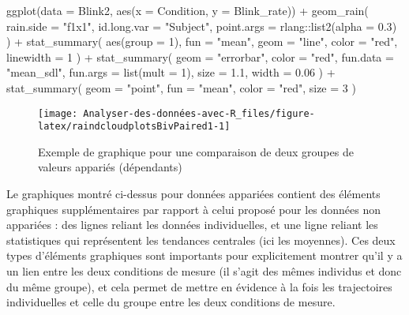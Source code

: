 \documentclass[
]{book}
\newenvironment{Shaded}{\begin{snugshade}}{\end{snugshade}}
\newcommand{\AttributeTok}[1]{\textcolor[rgb]{0.77,0.63,0.00}{#1}}
\newcommand{\DecValTok}[1]{\textcolor[rgb]{0.00,0.00,0.81}{#1}}
\newcommand{\FloatTok}[1]{\textcolor[rgb]{0.00,0.00,0.81}{#1}}
\newcommand{\FunctionTok}[1]{\textcolor[rgb]{0.00,0.00,0.00}{#1}}
\newcommand{\NormalTok}[1]{#1}
\newcommand{\SpecialCharTok}[1]{\textcolor[rgb]{0.00,0.00,0.00}{#1}}
\newcommand{\StringTok}[1]{\textcolor[rgb]{0.31,0.60,0.02}{#1}}
\begin{document}
\begin{Shaded}
\begin{Highlighting}[]
\FunctionTok{ggplot}\NormalTok{(}\AttributeTok{data =}\NormalTok{ Blink2, }\FunctionTok{aes}\NormalTok{(}\AttributeTok{x =}\NormalTok{ Condition, }\AttributeTok{y =}\NormalTok{ Blink\_rate)) }\SpecialCharTok{+}
  \FunctionTok{geom\_rain}\NormalTok{(}
    \AttributeTok{rain.side =} \StringTok{"f1x1"}\NormalTok{,}
    \AttributeTok{id.long.var =} \StringTok{"Subject"}\NormalTok{,}
    \AttributeTok{point.args =}\NormalTok{ rlang}\SpecialCharTok{::}\FunctionTok{list2}\NormalTok{(}\AttributeTok{alpha =} \FloatTok{0.3}\NormalTok{)}
\NormalTok{  ) }\SpecialCharTok{+}
  \FunctionTok{stat\_summary}\NormalTok{(}
    \FunctionTok{aes}\NormalTok{(}\AttributeTok{group =} \DecValTok{1}\NormalTok{),}
    \AttributeTok{fun =} \StringTok{"mean"}\NormalTok{,}
    \AttributeTok{geom =} \StringTok{"line"}\NormalTok{,}
    \AttributeTok{color =} \StringTok{"red"}\NormalTok{,}
    \AttributeTok{linewidth =} \DecValTok{1}
\NormalTok{  ) }\SpecialCharTok{+}
  \FunctionTok{stat\_summary}\NormalTok{(}
    \AttributeTok{geom =} \StringTok{"errorbar"}\NormalTok{,}
    \AttributeTok{color =} \StringTok{"red"}\NormalTok{,}
    \AttributeTok{fun.data =} \StringTok{"mean\_sdl"}\NormalTok{,}
    \AttributeTok{fun.args =} \FunctionTok{list}\NormalTok{(}\AttributeTok{mult =} \DecValTok{1}\NormalTok{),}
    \AttributeTok{size =} \FloatTok{1.1}\NormalTok{, }
    \AttributeTok{width =} \FloatTok{0.06}
\NormalTok{    ) }\SpecialCharTok{+} 
  \FunctionTok{stat\_summary}\NormalTok{(}
    \AttributeTok{geom =} \StringTok{"point"}\NormalTok{,}
    \AttributeTok{fun =} \StringTok{"mean"}\NormalTok{, }
    \AttributeTok{color =} \StringTok{"red"}\NormalTok{,}
    \AttributeTok{size =} \DecValTok{3}
\NormalTok{    )}
\end{Highlighting}
\end{Shaded}

\begin{figure}

{\centering \texttt{[image: Analyser-des-données-avec-R\_files/figure-latex/raindcloudplotsBivPaired1-1]} 

}

\caption{Exemple de graphique pour une comparaison de deux groupes de valeurs appariés (dépendants)}\label{fig:raindcloudplotsBivPaired1}
\end{figure}

Le graphiques montré ci-dessus pour données appariées contient des éléments graphiques supplémentaires par rapport à celui proposé pour les données non appariées : des lignes reliant les données individuelles, et une ligne reliant les statistiques qui représentent les tendances centrales (ici les moyennes). Ces deux types d'éléments graphiques sont importants pour explicitement montrer qu'il y a un lien entre les deux conditions de mesure (il s'agit des mêmes individus et donc du même groupe), et cela permet de mettre en évidence à la fois les trajectoires individuelles et celle du groupe entre les deux conditions de mesure.
\end{document}
